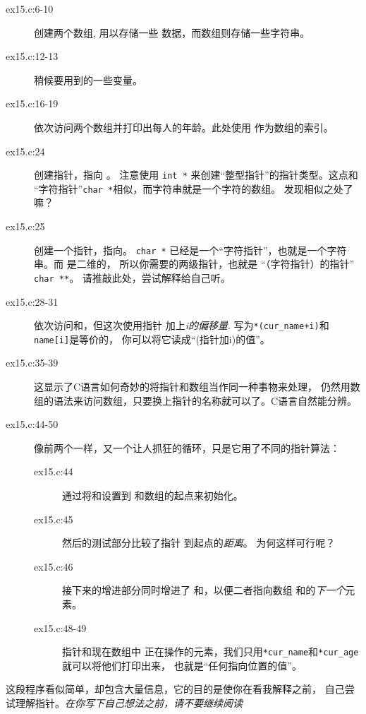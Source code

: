 \begin{description}
\item[ex15.c:6-10] 创建两个数组,  用以存储一些 
    数据，而数组则存储一些字符串。
\item[ex15.c:12-13] 稍候要用到的一些变量。
\item[ex15.c:16-19] 依次访问两个数组并打印出每人的年龄。此处使用
      作为数组的索引。
\item[ex15.c:24] 创建指针，指向 。
    注意使用 \verb|int *| 来创建“整型指针”的指针类型。这点和
    “字符指针”\verb|char *|相似，而字符串就是一个字符的数组。
    发现相似之处了嘛？
\item[ex15.c:25] 创建一个指针，指向。 \verb|char *| 
    已经是一个“字符指针”，也就是一个字符串。而 是二维的，
    所以你需要的两级指针，也就是 “（字符指针）的指针” \verb|char **|。
    请推敲此处，尝试解释给自己听。
\item[ex15.c:28-31] 依次访问和，但这次使用指针
    加上\emph{i的偏移量}.  写为\verb|*(cur_name+i)|和\verb|name[i]|是等价的，
    你可以将它读成“(指针加i)的值”。
\item[ex15.c:35-39] 这显示了C语言如何奇妙的将指针和数组当作同一种事物来处理，
    仍然用数组的语法来访问数组，只要换上指针的名称就可以了。C语言自然能分辨。
\item[ex15.c:44-50] 像前两个一样，又一个让人抓狂的循环，只是它用了不同的指针算法：
    \begin{description}
    \item[ex15.c:44] 通过将和设置到
        和数组的起点来初始化。
    \item[ex15.c:45] 然后的测试部分比较了指针
        到起点的\emph{距离}。 为何这样可行呢？
    \item[ex15.c:46] 接下来的增进部分同时增进了
        和，以便二者指向数组
        和的\emph{下一个}元素。
    \item[ex15.c:48-49] 指针和现在数组中
        正在操作的元素，我们只用\verb|*cur_name|和\verb|*cur_age|就可以将他们打印出来，
        也就是“任何指向位置的值”。
    \end{description}
\end{description}

这段程序看似简单，却包含大量信息，它的目的是使你在看我解释之前，
自己尝试理解指针。\emph{在你写下自己想法之前，请不要继续阅读}

